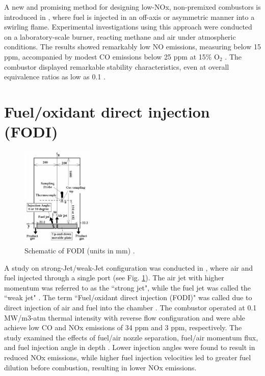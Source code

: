 A new and promising method for designing low-NOx, non-premixed combustors is introduced in \cite{YETTER20001265}, where fuel is injected in an off-axis or asymmetric manner into a swirling flame. Experimental investigations using this approach were conducted on a laboratory-scale burner, reacting methane and air under atmospheric conditions. The results showed remarkably low NO emissions, measuring below 15 ppm, accompanied by modest CO emissions below 25 ppm at 15$\%$ O$_2$ \cite{YETTER20001265}. The combustor displayed remarkable stability characteristics, even at overall equivalence ratios as low as 0.1 \cite{YETTER20001265}.

\section{Fuel/oxidant direct injection (FODI)}
\begin{figure}
\vspace{-10mm}
    \centering
    \includegraphics[width=0.3\textwidth]{Chapter2/Images/FODI.jpeg}
  \caption[Schematic of FODI]{Schematic of FODI (units in mm) \cite{He2008FlamelessCO}.}
  \label{fig:FODI}
\end{figure}

A study on strong-Jet/weak-Jet configuration was conducted in \cite{He2008FlamelessCO}, where air and fuel injected through a single port (see Fig. \ref{fig:FODI}). The air jet with higher momentum was referred to as the ``strong jet", while the fuel jet was called the ``weak jet" \cite{VAThesis2011}. The term ``Fuel/oxidant direct injection (FODI)" was called due to direct injection of air and fuel into the chamber \cite{VAThesis2011}. The combustor operated at 0.1 MW/m3-atm thermal intensity with reverse flow configuration and were able achieve low CO and NOx emissions of 34 ppm and 3 ppm, respectively. The study examined the effects of fuel/air nozzle separation, fuel/air momentum flux, and fuel injection angle in depth \cite{VAThesis2011}. Lower injection angles were found to result in reduced NOx emissions, while higher fuel injection velocities led to greater fuel dilution before combustion, resulting in lower NOx emissions. 

